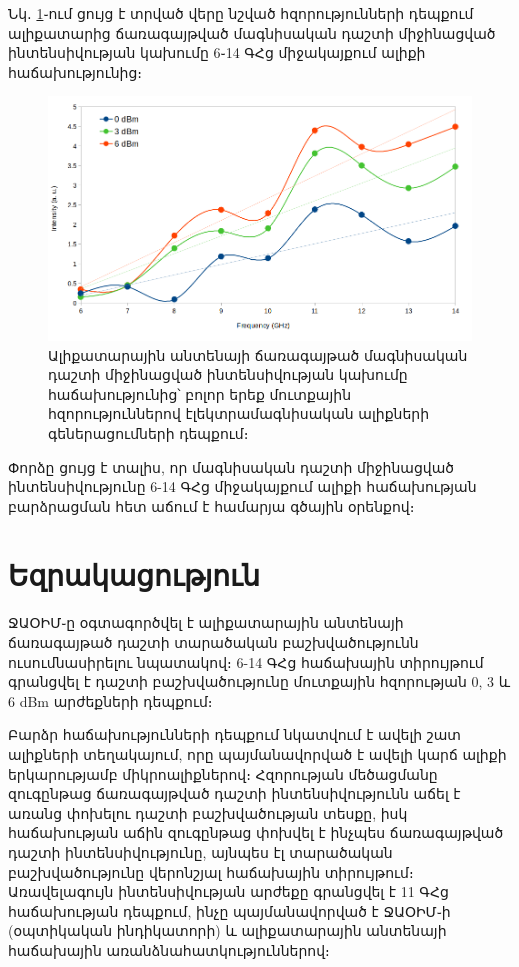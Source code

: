 \documentclass[12pt, fleqn]{report}
\begin{document}
Նկ․ \ref{fig:Int_vs_Freq_0_3_6_dBm}֊ում ցույց է տրված վերը նշված հզորությունների դեպքում ալիքատարից ճառագայթված մագնիսական դաշտի միջինացված ինտենսիվության կախումը 6֊14 ԳՀց միջակայքում ալիքի հաճախությունից։
\begin{figure}
    \centering
    \includegraphics[width=1.0\textwidth]{data/experiment-results/free_field_of_antenna_6-14GHz_0-6dBm_generator_output_distance_5mm.png}
    \caption{Ալիքատարային անտենայի ճառագայթած մագնիսական դաշտի միջինացված ինտենսիվության կախումը հաճախությունից՝ բոլոր երեք մուտքային հզորություններով էլեկտրամագնիսական ալիքների գեներացումների դեպքում։}
    \label{fig:Int_vs_Freq_0_3_6_dBm}
\end{figure}
Փորձը ցույց է տալիս, որ մագնիսական դաշտի միջինացված ինտենսիվությունը 6-14 ԳՀց միջակայքում ալիքի հաճախության բարձրացման հետ աճում է համարյա գծային օրենքով։

\newpage

\section*{Եզրակացություն}

ՋԱՕԻՄ֊ը օգտագործվել է ալիքատարային անտենայի ճառագայթած դաշտի տարածական բաշխվածությունն ուսումնասիրելու նպատակով։ 6-14 ԳՀց հաճախային տիրույթում գրանցվել է դաշտի բաշխվածությունը մուտքային հզորության 0, 3 և 6 dBm արժեքների դեպքում։

Բարձր հաճախությունների դեպքում նկատվում է ավելի շատ ալիքների տեղակայում, որը պայմանավորված է ավելի կարճ ալիքի երկարությամբ միկրոալիքներով։ Հզորության մեծացմանը զուգընթաց ճառագայթված դաշտի ինտենսիվությունն աճել է առանց փոխելու դաշտի բաշխվածության տեսքը, իսկ հաճախության աճին զուգընթաց փոխվել է ինչպես ճառագայթված դաշտի ինտենսիվությունը, այնպես էլ տարածական բաշխվածությունը վերոնշյալ հաճախային տիրույթում։ Առավելագույն ինտենսիվության արժեքը գրանցվել է 11 ԳՀց հաճախության դեպքում, ինչը պայմանավորված է ՋԱՕԻՄ֊ի (օպտիկական ինդիկատորի) և ալիքատարային անտենայի հաճախային առանձնահատկություններով։
\end{document}

